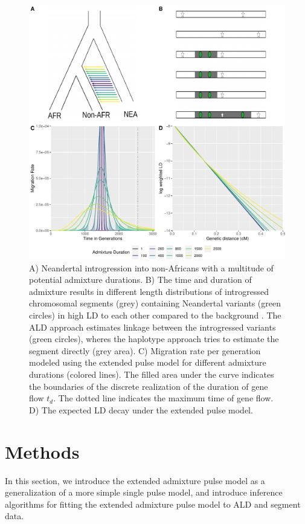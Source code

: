 \documentclass[]{article}
\begin{document}
\begin{figure}
\centering
\includegraphics{Admixture_Time_Inference_Paper_Draft_files/figure-latex/fig1-1.pdf}
\caption{\label{fig:fig1} A) Neandertal introgression into non-Africans with a multitude of potential admixture durations. B) The time and duration of admixture results in different length distributions of introgressed chromosomal segments (grey) containing  Neandertal variants (green circles)  in high LD to each other
compared to the background . The ALD approach estimates linkage
between the introgressed variants (green circles), wheres the haplotype approach tries
to estimate the segment directly (grey area). C) Migration rate per generation
modeled using the extended pulse model for different admixture durations (colored lines). The filled area under the curve indicates the boundaries of the discrete realization of the duration of gene flow $t_d$.
The dotted line indicates the maximum time of gene flow. D) The expected LD decay under the extended pulse model.}
\end{figure}

\section{Methods}\label{methods}
In this section,  we introduce the extended admixture pulse model as a generalization of a more simple single pulse model, and introduce inference algorithms for fitting the extended admixture pulse model to ALD and segment data. 
\end{document}
